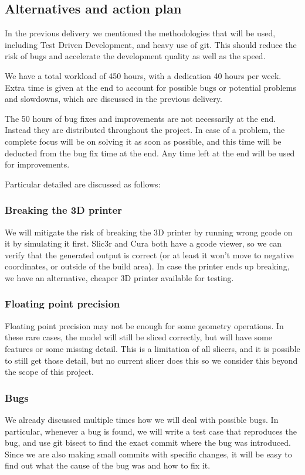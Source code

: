 \subsection{Alternatives and action plan}

In the previous delivery we mentioned the methodologies that will be used, including Test Driven Development, and heavy use of git. This should reduce the risk of bugs and accelerate the development quality as well as the speed.

We have a total workload of 450 hours, with a dedication 40 hours per week. Extra time is given at the end to account for possible bugs or potential problems and slowdowns, which are discussed in the previous delivery.

The 50 hours of bug fixes and improvements are not necessarily at the end. Instead they are distributed throughout the project. In case of a problem, the complete focus will be on solving it as soon as possible, and this time will be deducted from the bug fix time at the end. Any time left at the end will be used for improvements.

Particular detailed are discussed as follows:

\subsubsection{Breaking the 3D printer}
We will mitigate the risk of breaking the 3D printer by running wrong gcode on it by simulating it first. Slic3r and Cura both have a gcode viewer, so we can verify that the generated output is correct (or at least it won't move to negative coordinates, or outside of the build area). In case the printer ends up breaking, we have an alternative, cheaper 3D printer available for testing.

\subsubsection{Floating point precision}
Floating point precision may not be enough for some geometry operations. In these rare cases, the model will still be sliced correctly, but will have some features or some missing detail. This is a limitation of all slicers, and it is possible to still get those detail, but no current slicer does this so we consider this beyond the scope of this project.

\subsubsection{Bugs}
We already discussed multiple times how we will deal with possible bugs. In particular, whenever a bug is found, we will write a test case that reproduces the bug, and use git bisect to find the exact commit where the bug was introduced. Since we are also making small commits with specific changes, it will be easy to find out what the cause of the bug was and how to fix it.

